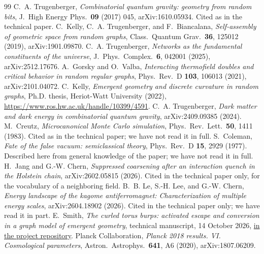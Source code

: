 \documentclass[11pt,letterpaper]{article}
\begin{document}
\renewcommand{\refname}{Sources}
\begin{thebibliography}{99}\small
 C.~A. Trugenberger, \emph{Combinatorial quantum gravity: geometry from random bits}, 
J.\ High Energy Phys.\ \textbf{09} (2017) 045, arXiv:1610.05934. Cited as in the technical paper.
 C.~Kelly, C.~A. Trugenberger, and F.~Biancalana, \emph{Self-assembly of geometric space
from random graphs}, Class.\ Quantum Grav.\ \textbf{36}, 125012 (2019), arXiv:1901.09870.
 C.~A. Trugenberger, \emph{Networks as the fundamental constituents of the universe},
J.\ Phys.\ Complex.\ \textbf{6}, 042001 (2025), arXiv:2512.17676.
 A.~Gorsky and O.~Valba, \emph{Interacting thermofield doubles and critical behavior in
random regular graphs}, Phys.\ Rev.\ D \textbf{103}, 106013 (2021), arXiv:2101.04072.
 C.~Kelly, \emph{Emergent geometry and discrete curvature in random graphs}, Ph.D.
thesis, Heriot-Watt University (2022), \url{https://www.ros.hw.ac.uk/handle/10399/4591}.
 C.~A. Trugenberger, \emph{Dark matter and dark energy in combinatorial quantum gravity},
arXiv:2409.09385 (2024).
 M.~Creutz, \emph{Microcanonical Monte Carlo simulation}, Phys.\ Rev.\ Lett.\ \textbf{50},
1411 (1983). Cited as in the technical paper; we have not read it in full.
 S.~Coleman, \emph{Fate of the false vacuum: semiclassical theory}, Phys.\ Rev.\ D
\textbf{15}, 2929 (1977). Described here from general knowledge of the paper; we have not read it in
full.
 H.~Jang and G.-W. Chern, \emph{Suppressed coarsening after an interaction quench in the
Holstein chain}, arXiv:2602.05815 (2026). Cited in the technical paper only, for the vocabulary of a
neighboring field.
 B.~B. Le, S.-H. Lee, and G.-W. Chern, \emph{Energy landscape of the kagome antiferromagnet:
Characterization of multiple energy scales}, arXiv:2604.18902 (2026). Cited in the technical paper only; we
have read it in part.
 E.~Smith, \emph{The curled torus burps: activated escape and conversion in a graph model
of emergent geometry}, technical manuscript, 14 October 2026,
\href{https://github.com/EmilySmithCreate/RecreationalPhysics/tree/main/docs/papers/curled_torus}{in the project repository}.
 Planck Collaboration, \emph{Planck 2018 results. VI. Cosmological parameters},
Astron.\ Astrophys.\ \textbf{641}, A6 (2020), arXiv:1807.06209.

\end{thebibliography}
\end{document}
